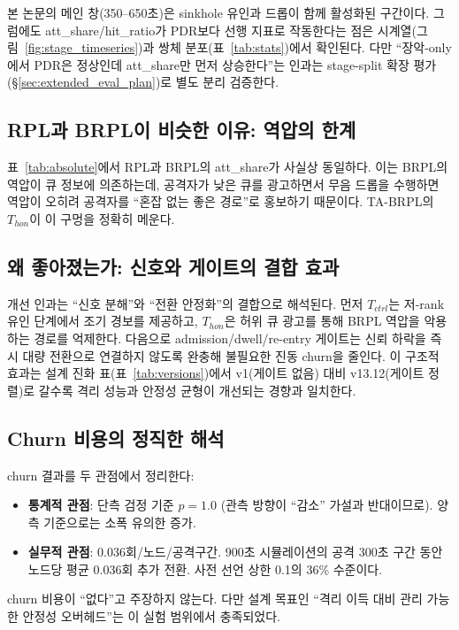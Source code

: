 \documentclass[12pt,a4paper]{article}
\begin{document}
본 논문의 메인 창(350--650초)은 sinkhole 유인과 드롭이 함께 활성화된 구간이다.
그럼에도 att\_share/hit\_ratio가 PDR보다 선행 지표로 작동한다는 점은
시계열(그림~\ref{fig:stage_timeseries})과 쌍체 분포(표~\ref{tab:stats})에서 확인된다.
다만 ``장악-only에서 PDR은 정상인데 att\_share만 먼저 상승한다''는 인과는
stage-split 확장 평가(\S\ref{sec:extended_eval_plan})로 별도 분리 검증한다.

\subsection{RPL과 BRPL이 비슷한 이유: 역압의 한계}

표~\ref{tab:absolute}에서 RPL과 BRPL의 att\_share가 사실상 동일하다.
이는 BRPL의 역압이 큐 정보에 의존하는데,
공격자가 낮은 큐를 광고하면서 무음 드롭을 수행하면
역압이 오히려 공격자를 ``혼잡 없는 좋은 경로''로 홍보하기 때문이다.
TA-BRPL의 $T_{hon}$이 이 구멍을 정확히 메운다.

\subsection{왜 좋아졌는가: 신호와 게이트의 결합 효과}

개선 인과는 ``신호 분해''와 ``전환 안정화''의 결합으로 해석된다.
먼저 $T_{ctrl}$는 저-rank 유인 단계에서 조기 경보를 제공하고,
$T_{hon}$은 허위 큐 광고를 통해 BRPL 역압을 악용하는 경로를 억제한다.
다음으로 admission/dwell/re-entry 게이트는
신뢰 하락을 즉시 대량 전환으로 연결하지 않도록 완충해
불필요한 진동 churn을 줄인다.
이 구조적 효과는 설계 진화 표(표~\ref{tab:versions})에서
v1(게이트 없음) 대비 v13.12(게이트 정렬)로 갈수록
격리 성능과 안정성 균형이 개선되는 경향과 일치한다.

\subsection{Churn 비용의 정직한 해석}

churn 결과를 두 관점에서 정리한다:
\begin{itemize}
  \item \textbf{통계적 관점}: 단측 검정 기준 $p = 1.0$
    (관측 방향이 ``감소'' 가설과 반대이므로).
    양측 기준으로는 소폭 유의한 증가.
  \item \textbf{실무적 관점}: 0.036회/노드/공격구간.
    900초 시뮬레이션의 공격 300초 구간 동안 노드당 평균 0.036회 추가 전환.
    사전 선언 상한 0.1의 36\% 수준이다.
\end{itemize}
churn 비용이 ``없다''고 주장하지 않는다.
다만 설계 목표인 ``격리 이득 대비 관리 가능한 안정성 오버헤드''는
이 실험 범위에서 충족되었다.
\end{document}
